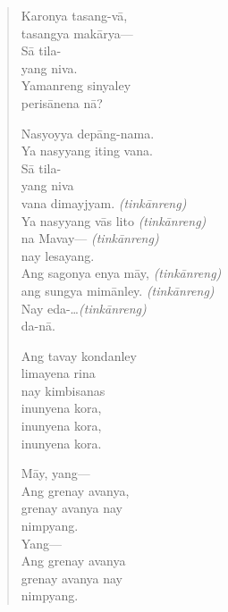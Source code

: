 \documentclass[12pt,paper=a4]{scrartcl}
\begin{document}
\begin{quote}
\begin{multicols}{2}
Karonya tasang-vā,\\
tasangya makārya---\\
Sā tila-\\
yang niva.\\
Yamanreng sinyaley\\
perisānena nā?

Nasyoyya depāng-nama.\\
Ya nasyyang iting vana.\\
Sā tila-\\
yang niva\\
vana dimayjyam.			\tab \textit{(tinkānreng)}\\
Ya nasyyang vās lito	\tab \textit{(tinkānreng)}\\
na Mavay---				\tab \textit{(tinkānreng)}\\
nay lesayang.\\
Ang sagonya enya māy,	\tab \textit{(tinkānreng)}\\
ang sungya mimānley.	\tab \textit{(tinkānreng)}\\
Nay eda-\dots			\tab \textit{(tinkānreng)}\\
da-nā.

\columnbreak

Ang tavay kondanley\\
limayena rina\\
nay kimbisanas\\
inunyena kora,\\
inunyena kora,\\
inunyena kora.

Māy, yang---\\
Ang grenay avanya,\\
grenay avanya nay\\
nimpyang.\\
Yang---\\
Ang grenay avanya\\
grenay avanya nay\\
nimpyang.
\end{multicols}



\end{quote}
\end{document}
